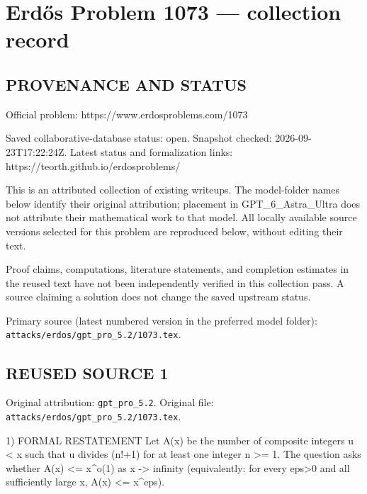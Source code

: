 \section*{Erd\H{o}s Problem 1073 --- collection record}

\subsection*{PROVENANCE AND STATUS}
Official problem: https://www.erdosproblems.com/1073

Saved collaborative-database status: open.
Snapshot checked: 2026-09-23T17:22:24Z.
Latest status and formalization links: https://teorth.github.io/erdosproblems/

This is an attributed collection of existing writeups. The model-folder names below identify their original attribution; placement in GPT\_6\_Astra\_Ultra does not attribute their mathematical work to that model. All locally available source versions selected for this problem are reproduced below, without editing their text.

Proof claims, computations, literature statements, and completion estimates in the reused text have not been independently verified in this collection pass. A source claiming a solution does not change the saved upstream status.

Primary source (latest numbered version in the preferred model folder): \texttt{attacks/erdos/gpt\_pro\_5.2/1073.tex}.

\subsection*{REUSED SOURCE 1}
Original attribution: \texttt{gpt\_pro\_5.2}.
Original file: \texttt{attacks/erdos/gpt\_pro\_5.2/1073.tex}.


1) FORMAL RESTATEMENT
Let A(x) be the number of composite integers u < x such that u divides (n!+1) for at least one integer n >= 1.
The question asks whether A(x) <= x^{o(1)} as x -> infinity (equivalently: for every eps>0 and all sufficiently large x, A(x) <= x^eps).

